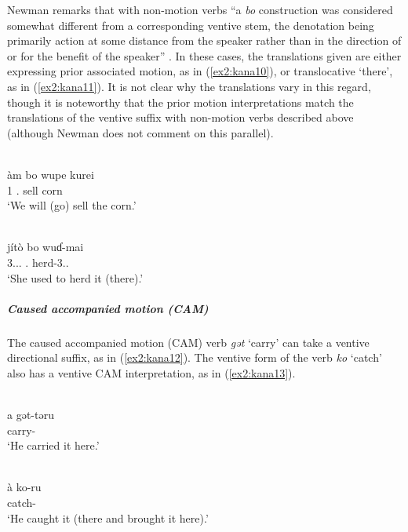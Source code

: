 Newman remarks that with non-motion verbs “a \textit{bo} construction was considered somewhat different from a corresponding ventive stem, the denotation being primarily action at some distance from the speaker rather than in the direction of or for the benefit of the speaker” \citep[76]{newmanKanakuruLanguage1974}. In these cases, the translations given are either expressing prior associated motion, as in (\ref{ex2:kana10}), or translocative `there', as in (\ref{ex2:kana11}). It is not clear why the translations vary in this regard, though it is noteworthy that the prior motion interpretations match the translations of the ventive suffix with non-motion verbs described above (although Newman does not comment on this parallel). 

\ea\label{ex2:kana10}
 \\
\gll àm	bo	wupe	kurei \\
1	.	sell	corn \\
\glt `We will (go) sell the corn.'

\ex\label{ex2:kana11}
 \\
\gll jítò	bo	wuɗ-mai \\
3...	.	herd-3.. \\
\glt `She used to herd it (there).'
\z 

\subparagraph{Caused accompanied motion (CAM)}



The caused accompanied motion (CAM) verb \textit{gət} `carry' can take a ventive directional suffix, as in (\ref{ex2:kana12}).  The ventive form of the verb \textit{ko} ‘catch’ also has a ventive CAM interpretation, as in (\ref{ex2:kana13}).

\ea\label{ex2:kana12}
 \\
\gll a	gət-təru \\
	carry- \\
\glt `He carried it here.'

\ex\label{ex2:kana13}
 \\
\gll à	ko-ru \\
	catch- \\
\glt `He caught it (there and brought it here).'
\z


